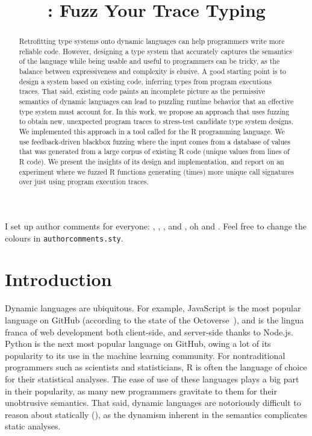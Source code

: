 \documentclass[sigplan,anonymous,review]{acmart}
\begin{document}
\title{\tool: Fuzz Your Trace Typing}

\begin{abstract}

Retrofitting type systems onto dynamic languages can help programmers write more reliable code.
However, designing a type system that accurately captures the semantics of the language while being usable and useful to programmers can be tricky, as the balance between expressiveness and complexity is elusive.
A good starting point is to design a system based on existing code, inferring types from program executions traces.
That said, existing code paints an incomplete picture as the permissive semantics of dynamic languages can lead to puzzling runtime behavior that an effective type system must account for.
In this work, we propose an approach that uses fuzzing to obtain new, unexpected program traces to stress-test candidate type system designs.
We implemented this approach in a tool called \tool for the R programming language.
We use feedback-driven blackbox fuzzing where the input comes from a database of values that was generated from a large corpus of existing R code (\DBValuesRnd unique values from \DBSourceLinesOfCodeRnd lines of R code).
We present the insights of its design and implementation, and report on an experiment where we fuzzed \UFNumFunctions R functions generating \UFSignatrAdditionalSignatures (\UFSignatrAdditionalSignaturesRatio times) more unique call signatures over just using program execution traces.

\end{abstract}

\maketitle

I set up author comments for everyone: , , , and , oh and . Feel free to change the
colours in {\tt authorcomments.sty}.

\section{Introduction}
\label{sec:introduction}

Dynamic languages are ubiquitous.
For example, JavaScript is the most popular language on GitHub (according to the state of the Octoverse~\cite{state-of-octoverse-2021}), and is the lingua franca of web development both client-side, and server-side thanks to Node.js.
Python is the next most popular language on GitHub, owing a lot of its popularity to its use in the machine learning community.
For nontraditional programmers such as scientists and statisticians, R is often the language of choice for their statistical analyses.
The ease of use of these languages plays a big part in their popularity, as many new programmers gravitate to them for their unobtrusive semantics.
That said, dynamic languages are notoriously difficult to reason about statically (), as the dynamism inherent in the semantics complicates static analyses.
\end{document}
